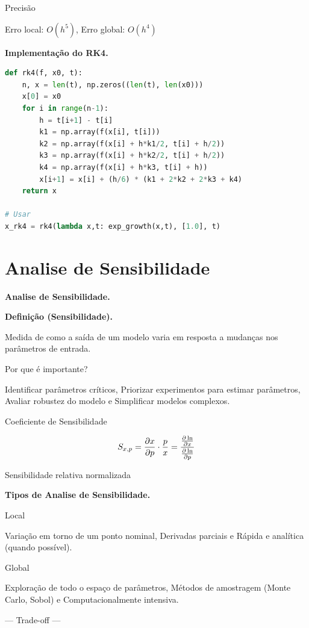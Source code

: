 Precisão

Erro local: $O(h^5)$, Erro global: $O(h^4)$

\textbf{Implementação do RK4.}

%
\begin{lstlisting}[language=Python, caption=Runge-Kutta 4, basicstyle=\ttfamily\footnotesize]
def rk4(f, x0, t):
    n, x = len(t), np.zeros((len(t), len(x0)))
    x[0] = x0
    for i in range(n-1):
        h = t[i+1] - t[i]
        k1 = np.array(f(x[i], t[i]))
        k2 = np.array(f(x[i] + h*k1/2, t[i] + h/2))
        k3 = np.array(f(x[i] + h*k2/2, t[i] + h/2))
        k4 = np.array(f(x[i] + h*k3, t[i] + h))
        x[i+1] = x[i] + (h/6) * (k1 + 2*k2 + 2*k3 + k4)
    return x

# Usar
x_rk4 = rk4(lambda x,t: exp_growth(x,t), [1.0], t)
\end{lstlisting}
%

\section{Analise de Sensibilidade}

\textbf{Analise de Sensibilidade.}

\textbf{Definição (Sensibilidade).}

Medida de como a saída de um modelo varia em resposta a mudanças nos parâmetros de entrada.

Por que é importante?

Identificar parâmetros críticos, Priorizar experimentos para estimar parâmetros, Avaliar robustez do modelo e Simplificar modelos complexos.

Coeficiente de Sensibilidade

%
\begin{equation*}
S_{x,p} = \frac{\partial x}{\partial p} \cdot \frac{p}{x} = \frac{\frac{\partial \ln}{\partial x}}{\frac{\partial \ln}{\partial p}}
\end{equation*}
%

Sensibilidade relativa normalizada

\textbf{Tipos de Analise de Sensibilidade.}

Local

Variação em torno de um ponto nominal, Derivadas parciais e Rápida e analítica (quando possível).

Global

Exploração de todo o espaço de parâmetros, Métodos de amostragem (Monte Carlo, Sobol) e Computacionalmente intensiva.

--- Trade-off ---


